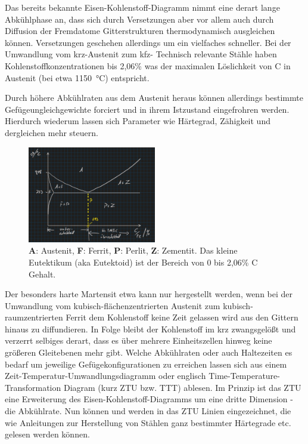 Das bereits bekannte Eisen-Kohlenstoff-Diagramm nimmt eine derart lange Abkühlphase an, dass sich durch Versetzungen aber
vor allem auch durch Diffusion der Fremdatome Gitterstrukturen thermodynamisch ausgleichen können. Versetzungen geschehen
allerdings um ein vielfaches schneller. Bei der Umwandlung vom krz-Austenit zum kfz- Technisch relevante Stähle
haben Kohlenstoffkonzentrationen bis 2,06\% was der maximalen Löslichkeit von C in Austenit (bei etwa \SI[]{1150}{\celsius})
entspricht.

Durch höhere Abkühlraten aus dem Austenit heraus können allerdings bestimmte Gefügeungleichgewichte forciert und in ihrem
Istzustand eingefrohren werden. Hierdurch wiederum lassen sich Parameter wie Härtegrad, Zähigkeit und dergleichen mehr
steuern.
\begin{figure}
    \vspace{-10pt}
    \centering
    \includegraphics[width=0.5\textwidth]{entries/8/eutektoid.jpg}
    \caption{\textbf{A}: Austenit, \textbf{F}: Ferrit, \textbf{P}: Perlit, \textbf{Z}: Zementit. Das kleine Eutektikum (aka Eutektoid) ist der Bereich von 0 bis 2,06\% C Gehalt.}
    \label{fig:eutekt}
\end{figure}
Der besonders harte Martensit etwa kann nur hergestellt werden, wenn bei der Umwandlung vom kubisch-flächenzentrierten
Austenit zum kubisch-raumzentrierten Ferrit dem Kohlenstoff keine Zeit gelassen wird aus den Gittern hinaus zu diffundieren.
In Folge bleibt der Kohlenstoff im krz zwangsgelößt und verzerrt selbiges derart, dass es über mehrere Einheitszellen hinweg
keine größeren Gleitebenen mehr gibt. Welche Abkühlraten oder auch Haltezeiten es bedarf um jeweilige Gefügekonfigurationen
zu erreichen lassen sich aus einem Zeit-Temperatur-Umwandlungsdiagramm oder englisch Time-Temperature-Transformation Diagram
(kurz ZTU bzw. TTT) ablesen. Im Prinzip ist das ZTU eine Erweiterung des Eisen-Kohlenstoff-Diagramms um eine dritte Dimension
- die Abkühlrate.
Nun können und werden in das ZTU Linien eingezeichnet, die wie Anleitungen zur Herstellung von Stählen ganz bestimmter
Härtegrade etc. gelesen werden können.

